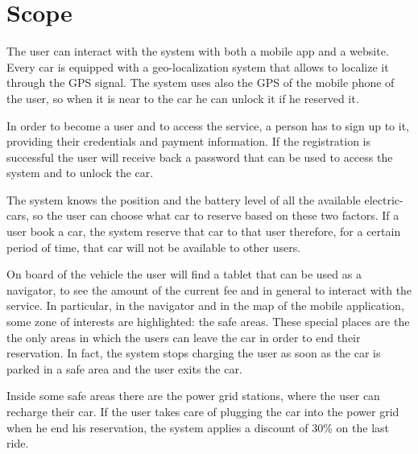 \section{Scope}
The user can interact with the system with both a mobile app and a website.
Every car is equipped with a geo-localization system that allows to localize it through the GPS signal.
The system uses also the GPS of the mobile phone of the user, so when it is near to the car he can unlock it if he reserved it.

In order to become a user and to access the service, a person has to sign up to it, providing their credentials and payment information. If the registration is successful the user will receive back a password that can be used to access the system and to unlock the car.

The system knows the position and the battery level of all the available electric-cars, so the user can choose what car to reserve based on these two factors. If a user book a car, the system reserve that car to that user therefore, for a certain period of time, that car will not be available to other users.

On board of the vehicle the user will find a tablet that can be used as a navigator, to see the amount of the current fee and in general to interact with the service. In particular, in the navigator and in the map of the mobile application, some zone of interests are highlighted: the safe areas. These special places are the the only areas in which the users can leave the car in order to end their reservation. In fact, the system stops charging the user as soon as the car is parked in a safe area and the user exits the car.

Inside some safe areas there are the power grid stations, where the user can recharge their car. If the user takes care of plugging the car into the power grid when he end his reservation, the system applies a discount of 30\% on the last ride.
